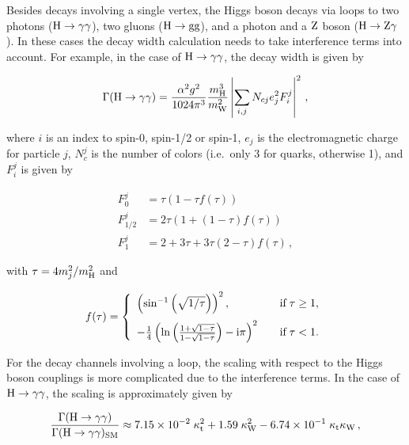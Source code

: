 Besides decays involving a single vertex, the Higgs boson decays via loops to two photons ($\mathrm{H}\to\mathrm{\gamma}\mathrm{\gamma}$), two gluons ($\mathrm{H}\to\mathrm{g}\mathrm{g}$), and a photon and a $\mathrm{Z}$ boson ($\mathrm{H}\to\mathrm{Z}\mathrm{\gamma}$).
% 
In these cases the decay width calculation needs to take interference terms into account.
% 
For example, in the case of $\mathrm{H}\to\mathrm{\gamma}\mathrm{\gamma}$, the decay width is given by~\cite{higgshunter}
% 
\begin{linenomath*}
\begin{equation}
\Gamma(\mathrm{H}\to\mathrm{\gamma}\mathrm{\gamma}) =
\frac{\alpha^2g^2}{1024\pi^3} \frac{m_{\mathrm{H}}^3}{m_\mathrm{W}^2}
\left|
\sum_{i,j} N_{cj} e_j^2 F_i^j
\right|^2
\,,
\end{equation}
\end{linenomath*}
% 
where $i$ is an index to spin-0, spin-1/2 or spin-1, $e_j$ is the electromagnetic charge  for particle $j$, $N_c^j$ is the number of colors (i.e.\ only 3 for quarks, otherwise 1), and $F_i^j$ is given by
% 
\begin{linenomath*}
\begin{equation}
\begin{split}
F_0^j     &= \tau (1- \tau f(\tau)) \\
F_{1/2}^j &= 2\tau ( 1 + (1-\tau) f(\tau) ) \\
F_1^j     &= 2 + 3\tau + 3\tau( 2-\tau ) f(\tau)
\,,
\end{split}
\end{equation}
\end{linenomath*}
% 
with $\tau = 4m_j^2/m_{\mathrm{H}}^2$ and
% 
\begin{linenomath*}
\begin{equation}
\label{eq:ffunction}
f(\tau) = \left\{%
\begin{array}{ll}
\left( \text{sin}^{-1}\left(\sqrt{1/\tau}\right) \right)^2 ,
    & \quad \text{if} \; \tau \ge 1, \\[9pt]
-\frac{1}{4} \left(
        \ln \left(\frac{1+\sqrt{1-\tau}}{1-\sqrt{1-\tau}} \right)
        -\imag \pi 
        \right)^2
    & \quad \text{if} \; \tau < 1.
\end{array}%
\right. 
\end{equation}
\end{linenomath*}
% 
For the decay channels involving a loop, the scaling with respect to the Higgs boson couplings is more complicated due to the interference terms.
% 
In the case of $\mathrm{H}\to\mathrm{\gamma}\mathrm{\gamma}$, the scaling is approximately given by~\cite{higgshunter}
% 
\begin{linenomath*}
\begin{equation}
\frac{\Gamma(\mathrm{H}\to\mathrm{\gamma}\mathrm{\gamma})}{\Gamma(\mathrm{H}\to\mathrm{\gamma}\mathrm{\gamma})_\text{SM}} \approx
        7.15 \times 10^{-2}    \;   \kappa_{\mathrm{t}}^2
        + 1.59                \;  \kappa_{\mathrm{W}}^2
        - 6.74 \times 10^{-1} \;  \kappa_{\mathrm{t}}\kappa_{\mathrm{W}}
\,,
\end{equation}
\end{linenomath*}
